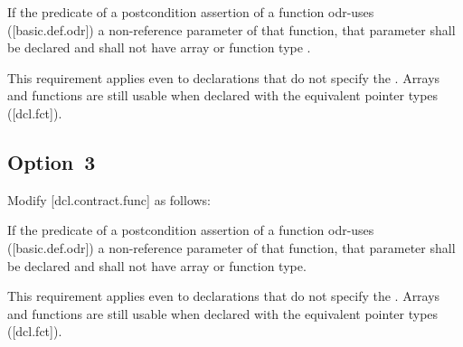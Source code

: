 \begin{adjustwidth}{0.5cm}{0.5cm}
If the predicate of a postcondition assertion of a function  odr-uses ([basic.def.odr]) a
non-reference parameter of that function, that parameter  shall be declared  and shall not have array or function type .
\begin{note}
This requirement applies even to declarations
that do not specify the . Arrays and functions are still usable when declared with the equivalent pointer types ([dcl.fct]).
\end{note}
\begin{example}
\tcode{[...]}
\end{example}
\end{adjustwidth}

\subsection*{Option~3}

Modify [dcl.contract.func] as follows:

\begin{adjustwidth}{0.5cm}{0.5cm}
If the predicate of a postcondition assertion of a function odr-uses ([basic.def.odr]) a
non-reference parameter of that function, that parameter shall be declared  and
shall not have array or function type.
\begin{note}
This requirement applies even to declarations
that do not specify the . Arrays and functions are still usable when declared with the equivalent pointer types ([dcl.fct]).
\end{note}
\begin{example}
\tcode{[...]}
\end{example}

\end{adjustwidth}




\renewcommand{\addcontentsline}[3]{}%








